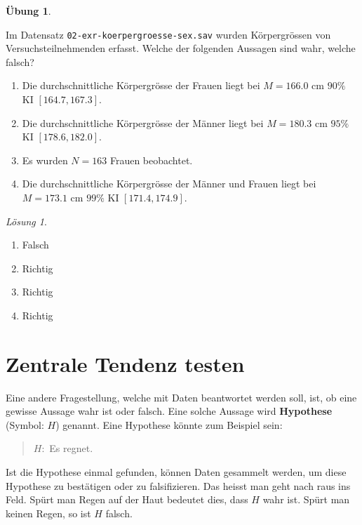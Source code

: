 \documentclass[
]{book}
\providecommand{\tightlist}{%
  \setlength{\itemsep}{0pt}\setlength{\parskip}{0pt}}
\theoremstyle{definition}
\theoremstyle{definition}
\theoremstyle{definition}
\newtheorem{exercise}{Übung}[chapter]
\theoremstyle{definition}
\theoremstyle{remark}
\newtheorem*{solution}{Lösung}
\begin{document}
\begin{exercise}
\protect\hypertarget{exr:ki-praxis}{}\label{exr:ki-praxis}

Im Datensatz \texttt{02-exr-koerpergroesse-sex.sav} wurden Körpergrössen von Versuchsteilnehmenden erfasst. Welche der folgenden Aussagen sind wahr, welche falsch?

\begin{enumerate}
\def\labelenumi{\alph{enumi})}
\tightlist
\item
  Die durchschnittliche Körpergrösse der Frauen liegt bei \(M = 166.0\) cm \(90\%\) KI \([164.7, 167.3]\).
\item
  Die durchschnittliche Körpergrösse der Männer liegt bei \(M = 180.3\) cm \(95\%\) KI \([178.6, 182.0]\).
\item
  Es wurden \(N= 163\) Frauen beobachtet.
\item
  Die durchschnittliche Körpergrösse der Männer und Frauen liegt bei \(M = 173.1\) cm \(99\%\) KI \([171.4, 174.9]\).
\end{enumerate}

\end{exercise}

\begin{solution}
\leavevmode

\begin{enumerate}
\def\labelenumi{\alph{enumi})}
\tightlist
\item
  Falsch
\item
  Richtig
\item
  Richtig
\item
  Richtig
\end{enumerate}

\end{solution}

\chapter{Zentrale Tendenz testen}\label{zentrale-tendenz-testen}

Eine andere Fragestellung, welche mit Daten beantwortet werden soll, ist, ob eine gewisse Aussage wahr ist oder falsch. \label{customdef-hypothese}{Eine solche Aussage wird \textbf{Hypothese} (Symbol: \(H\)) genannt.} Eine Hypothese könnte zum Beispiel sein:

\begin{quote}
\(H:\) Es regnet.
\end{quote}

Ist die Hypothese einmal gefunden, können Daten gesammelt werden, um diese Hypothese zu bestätigen oder zu falsifizieren. Das heisst man geht nach raus ins Feld. Spürt man Regen auf der Haut bedeutet dies, dass \(H\) wahr ist. Spürt man keinen Regen, so ist \(H\) falsch.
\end{document}
